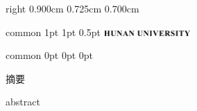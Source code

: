 \documentclass[
    report,     %
    oneside,    %
    UTF8,       %
    zihao=-4    %
]{config} %
\begin{document}
\CoverPage
    {right} %
    {0.900cm} %
    {0.725cm} %
    {0.700cm} %


\Header
    {common} %
    {1pt} %
    {1pt} %
    {0.5pt} %
    {} %
    {\includegraphics[width=0.25\textwidth]{figures/logos/HNU-title-EN.png}} %
    {} %


\Footer
    {common} %
    {0pt} %
    {0pt} %
    {0pt} %
    {} %
    {\thepage} %
    {} %


\SetRomanPageNumber{} %


\begin{abstractCN}[0.6cm] %

摘要

\def\keywordsCN{关键词1；关键词2；关键词3；关键词4；关键词5}

\end{abstractCN}


\begin{abstractEN}[0.6cm] %

abstract

\def\keywordsEN{keyword 1; keyword 2; keyword 3; keyword 4; keyword 5}

\end{abstractEN}

\end{document}
